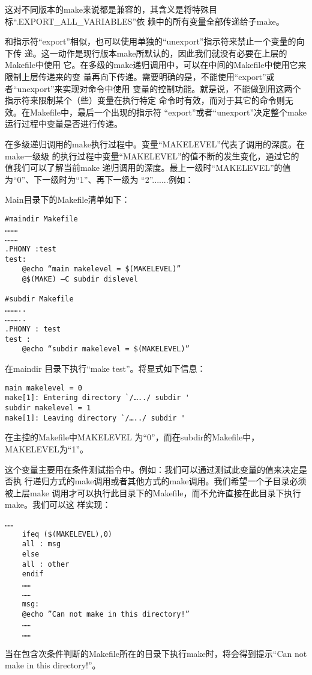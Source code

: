 \noindent
这对不同版本的make来说都是兼容的，其含义是将特殊目标“.EXPORT\_ALL\_VARIABLES”依
赖中的所有变量全部传递给子make。

和指示符“export”相似，也可以使用单独的“unexport”指示符来禁止一个变量的向下传
递。这一动作是现行版本make所默认的，因此我们就没有必要在上层的Makefile中使用
它。在多级的make递归调用中，可以在中间的Makefile中使用它来限制上层传递来的变
量再向下传递。需要明确的是，不能使用“export”或者“unexport”来实现对命令中使用
变量的控制功能。就是说，不能做到用这两个指示符来限制某个（些）变量在执行特定
命令时有效，而对于其它的命令则无效。在Makefile中，最后一个出现的指示符
“export”或者“unexport”决定整个make运行过程中变量是否进行传递。

在多级递归调用的make执行过程中。变量“MAKELEVEL”代表了调用的深度。在make一级级
的执行过程中变量“MAKELEVEL”的值不断的发生变化，通过它的值我们可以了解当前make
递归调用的深度。最上一级时“MAKELEVEL”的值为“0”、下一级时为“1”、再下一级为
“2”.......例如：

Main目录下的Makefile清单如下：
\begin{Verbatim}[]
#maindir Makefile
………
………
.PHONY :test
test:
    @echo “main makelevel = $(MAKELEVEL)”
    @$(MAKE) –C subdir dislevel

#subdir Makefile
………..
………..
.PHONY : test
test :
    @echo “subdir makelevel = $(MAKELEVEL)”
\end{Verbatim}

在maindir 目录下执行“make test”。将显式如下信息：
\begin{Verbatim}[]
main makelevel = 0
make[1]: Entering directory `/…../ subdir '
subdir makelevel = 1
make[1]: Leaving directory `/…../ subdir '
\end{Verbatim}

在主控的Makefile中MAKELEVEL 为“0”，而在subdir的Makefile中，MAKELEVEL为“1”。

这个变量主要用在条件测试指令中。例如：我们可以通过测试此变量的值来决定是否执
行递归方式的make调用或者其他方式的make调用。我们希望一个子目录必须被上层make
调用才可以执行此目录下的Makefile，而不允许直接在此目录下执行make。我们可以这
样实现：
\begin{Verbatim}[]
    ……
    ifeq ($(MAKELEVEL),0)
    all : msg
    else
    all : other
    endif
    ……
    ……
    msg:
    @echo ”Can not make in this directory!”
    ……
    ……
\end{Verbatim}

当在包含次条件判断的Makefile所在的目录下执行make时，将会得到提示“Can not make
in this directory!”。

